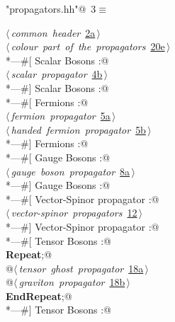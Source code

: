 \documentclass[a4paper,12pt]{amsart}
\renewcommand{\NWtarget}[2]{\hypertarget{#1}{#2}}
\renewcommand{\NWlink}[2]{\hyperlink{#1}{#2}}
\renewcommand{\NWsep}{${\diamond}$}
\begin{document}
\begin{flushleft} \small\label{scrap3}\raggedright\small
\NWtarget{nuweb3}{} \verb@"propagators.hh"@\nobreak\ {\footnotesize {3}}$\equiv$
\vspace{-1ex}
\begin{list}{}{} \item
\mbox{}\verb@@\hbox{$\langle\,${\itshape common header}\nobreak\ {\footnotesize \NWlink{nuweb2a}{2a}}$\,\rangle$}\verb@@\\
\mbox{}\verb@@\hbox{$\langle\,${\itshape colour part of the propagators}\nobreak\ {\footnotesize \NWlink{nuweb20e}{20e}}$\,\rangle$}\verb@@\\
\mbox{}\verb@*---#[ Scalar Bosons :@\\
\mbox{}\verb@@\hbox{$\langle\,${\itshape scalar propagator}\nobreak\ {\footnotesize \NWlink{nuweb4b}{4b}}$\,\rangle$}\verb@@\\
\mbox{}\verb@*---#] Scalar Bosons :@\\
\mbox{}\verb@*---#[ Fermions :@\\
\mbox{}\verb@@\hbox{$\langle\,${\itshape fermion propagator}\nobreak\ {\footnotesize \NWlink{nuweb5a}{5a}}$\,\rangle$}\verb@@\\
\mbox{}\verb@@\hbox{$\langle\,${\itshape handed fermion propagator}\nobreak\ {\footnotesize \NWlink{nuweb5b}{5b}}$\,\rangle$}\verb@@\\
\mbox{}\verb@*---#] Fermions :@\\
\mbox{}\verb@*---#[ Gauge Bosons :@\\
\mbox{}\verb@@\hbox{$\langle\,${\itshape gauge boson propagator}\nobreak\ {\footnotesize \NWlink{nuweb8a}{8a}}$\,\rangle$}\verb@@\\
\mbox{}\verb@*---#] Gauge Bosons :@\\
\mbox{}\verb@*---#[ Vector-Spinor propagator :@\\
\mbox{}\verb@@\hbox{$\langle\,${\itshape vector-spinor propagators}\nobreak\ {\footnotesize \NWlink{nuweb12}{12}}$\,\rangle$}\verb@@\\
\mbox{}\verb@*---#] Vector-Spinor propagator :@\\
\mbox{}\verb@*---#[ Tensor Bosons :@\\
\mbox{}\verb@@\hbox{\sffamily\bfseries Repeat}\verb@;@\\
\mbox{}\verb@   @\hbox{$\langle\,${\itshape tensor ghost propagator}\nobreak\ {\footnotesize \NWlink{nuweb18a}{18a}}$\,\rangle$}\verb@@\\
\mbox{}\verb@   @\hbox{$\langle\,${\itshape graviton propagator}\nobreak\ {\footnotesize \NWlink{nuweb18b}{18b}}$\,\rangle$}\verb@@\\
\mbox{}\verb@@\hbox{\sffamily\bfseries EndRepeat}\verb@;@\\
\mbox{}\verb@*---#] Tensor Bosons :@\\
\mbox{}\verb@@{\NWsep}
\end{list}
\vspace{-1.5ex}
\footnotesize
\begin{list}{}{\setlength{\itemsep}{-\parsep}\setlength{\itemindent}{-\leftmargin}}


\end{list}
\end{flushleft}
\end{document}
